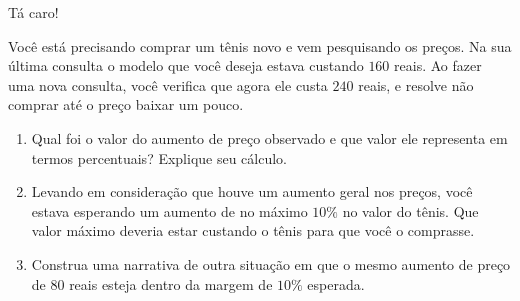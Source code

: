 \begin{task}{Tá caro!}

Você está precisando comprar um tênis novo e vem pesquisando os preços. Na sua última consulta o modelo que você deseja estava custando $160$ reais. Ao fazer uma nova consulta, você verifica que agora ele custa $240$ reais, e resolve não comprar até o preço baixar um pouco.

\begin{enumerate}

\item{}
Qual foi o valor do aumento de preço observado e que valor ele representa em termos percentuais? Explique seu cálculo.

\item{}
Levando em consideração que houve um aumento geral nos preços, você estava esperando um aumento de no máximo $10\%$ no valor do tênis. Que valor máximo deveria estar custando o tênis para que você o comprasse.

\item{}
Construa uma narrativa de outra situação em que o mesmo aumento de preço de $80$ reais esteja dentro da margem de $10\%$ esperada.

\end{enumerate}

\end{task}

